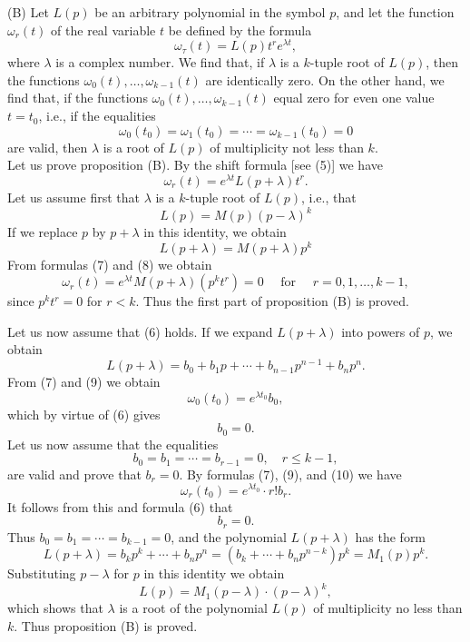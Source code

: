 \documentclass[10pt,a5paper]{book}
\theoremstyle{plain}
\theoremstyle{definition}
\theoremstyle{remark}
\begin{document}
(B) Let $L(p)$ be an arbitrary polynomial in the symbol $p$, and let the function $\omega_{r}(t)$ of the real variable $t$ be defined by the formula
\[
\omega_{\tau}(t)=L(p) t^{r} e^{\lambda t},
\]
where $\lambda$ is a complex number. We find that, if $\lambda$ is a $k$-tuple root of $L(p)$, then the functions $\omega_{0}(t), \ldots, \omega_{k-1}(t)$ are identically zero. On the other hand, we find that, if the functions $\omega_{0}(t), \ldots, \omega_{k-1}(t)$ equal zero for even one value $t=t_{0}$, i.e., if the equalities
\begin{equation*}
\omega_{0}\left(t_{0}\right)=\omega_{1}\left(t_{0}\right)=\cdots=\omega_{k-1}\left(t_{0}\right)=0 \tag{6}
\end{equation*}
are valid, then $\lambda$ is a root of $L(p)$ of multiplicity not less than $k$.\\[0pt]
Let us prove proposition (B). By the shift formula [see (5)] we have
\begin{equation*}
\omega_{r}(t)=e^{\lambda t} L(p+\lambda) t^{r} . \tag{7}
\end{equation*}
Let us assume first that $\lambda$ is a $k$-tuple root of $L(p)$, i.e., that
\[
L(p)=M(p)(p-\lambda)^{k}
\]
If we replace $p$ by $p+\lambda$ in this identity, we obtain
\begin{equation*}
L(p+\lambda)=M(p+\lambda) p^{k} \tag{8}
\end{equation*}
From formulas (7) and (8) we obtain
\[
\omega_{r}(t)=e^{\lambda t} M(p+\lambda)\left(p^{k} t^{r}\right)=0 \quad \text { for } \quad r=0,1, \ldots, k-1,
\]
since $p^{k} t^{r}=0$ for $r<k$. Thus the first part of proposition (B) is proved.

Let us now assume that (6) holds. If we expand $L(p+\lambda)$ into powers of $p$, we obtain
\begin{equation*}
L(p+\lambda)=b_{0}+b_{1} p+\cdots+b_{n-1} p^{n-1}+b_{n} p^{n} . \tag{9}
\end{equation*}
From (7) and (9) we obtain
\[
\omega_{0}\left(t_{0}\right)=e^{\lambda t_{0}} b_{0},
\]
which by virtue of (6) gives
\[
b_{0}=0 .
\]
Let us now assume that the equalities
\begin{equation*}
b_{0}=b_{1}=\cdots=b_{r-1}=0, \quad r \leq k-1, \tag{10}
\end{equation*}
are valid and prove that $b_{r}=0$. By formulas (7), (9), and (10) we have
\[
\omega_{r}\left(t_{0}\right)=e^{\lambda t_{0}} \cdot r!b_{r} .
\]
It follows from this and formula (6) that
\[
b_{r}=0 .
\]
Thus $b_{0}=b_{1}=\cdots=b_{k-1}=0$, and the polynomial $L(p+\lambda)$ has the form
\[
L(p+\lambda)=b_{k} p^{k}+\cdots+b_{n} p^{n}=\left(b_{k}+\cdots+b_{n} p^{n-k}\right) p^{k}=M_{1}(p) p^{k} .
\]
Substituting $p-\lambda$ for $p$ in this identity we obtain
\[
L(p)=M_{1}(p-\lambda) \cdot(p-\lambda)^{k},
\]
which shows that $\lambda$ is a root of the polynomial $L(p)$ of multiplicity no less than $k$. Thus proposition (B) is proved.
\end{document}
